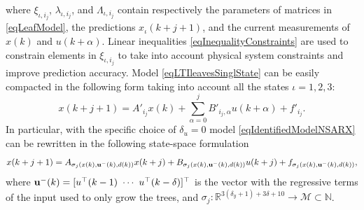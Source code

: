 \noindent where $\xi_{\iota,i_j}$, $\lambda_{\iota,i_j}$, and $\Lambda_{\iota,i_j}$ contain respectively the parameters of matrices in \eqref{eqLeafModel}, the predictions $x_\iota(k+j+1)$, and the current measurements of $x(k)$ and $u(k+\alpha)$. Linear inequalities \eqref{eqInequalityConstraints} are used to constrain elements in $\xi_{\iota,i_j}$ to take into account physical system constraints and improve prediction accuracy.
Model \eqref{eqLTIleavesSinglState} can be easily compacted in the following form taking into account all the states $\iota=1,2,3$:
\begin{equation}\label{eqLTIleavesCompact}
x(k+j+1) = A'_{i_j}x(k) + \sum_{\alpha = 0}^{j}{B'_{i_j,\alpha}u(k+\alpha)} + f'_{i_j}.
\end{equation}
\noindent In particular, with the specific choice of $\delta_u = 0$ model \eqref{eqIdentifiedModelNSARX} can be rewritten in the following state-space formulation
\begin{equation}\label{eqIdentifiedModelN}
x(k+j+1) =	A_{\sigma_j(x(k),\bold{u^-}(k),d(k))} x(k+j) + B_{\sigma_j(x(k),\bold{u^-}(k),d(k))} u(k+j) + f_{\sigma_j(x(k),\bold{u^-}(k),d(k))},
\end{equation}
where $\bold{u^-}(k) = [u^\top(k-1)\ \cdots\ u^\top(k-\delta)]^\top$ is the vector with the regressive terms of the input used to only grow the trees, and  $\sigma_j : \mathbb{R}^{3(\delta_y+1)+3\delta+10} \to \mathcal M \subset \mathbb{N}$.
%

